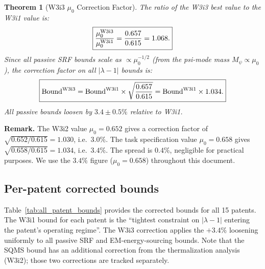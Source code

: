 \documentclass[11pt,twocolumn]{article}
\newcommand{\lam}{\lambda}
\newcommand{\Mpsi}{M_\psi}
\newtheorem{theorem}{Theorem}[section]
\begin{document}
\begin{theorem}[W3i3 $\mu_0$ Correction Factor]
\label{thm:mu0_w3i3}
The ratio of the W3i3 best value to the W3i1 value is:
\begin{equation}
\boxed{
\frac{\mu_0^{\rm W3i3}}{\mu_0^{\rm W3i1}} = \frac{0.657}{0.615} = 1.068.
}
\label{eq:mu0_ratio}
\end{equation}
Since all passive SRF bounds scale as $\propto \mu_0^{-1/2}$ (from
the psi-mode mass $\Mpsi \propto \mu_0$), the correction factor on
\emph{all} $|\lam-1|$ bounds is:
\begin{equation}
\boxed{
\text{Bound}^{\rm W3i3} = \text{Bound}^{\rm W3i1}\times
\sqrt{\frac{0.657}{0.615}} = \text{Bound}^{\rm W3i1}\times1.034.
}
\label{eq:bound_correction}
\end{equation}
All passive bounds loosen by $3.4\pm0.5\%$ relative to W3i1.
\end{theorem}

\textbf{Remark.} The W3i2 value $\mu_0 = 0.652$ gives a correction
factor of $\sqrt{0.652/0.615} = 1.030$, i.e.~$3.0\%$. The task
specification value $\mu_0 = 0.658$ gives $\sqrt{0.658/0.615} = 1.034$,
i.e.~$3.4\%$. The spread is $0.4\%$, negligible for practical purposes.
We use the $3.4\%$ figure ($\mu_0 = 0.658$) throughout this document.

\subsection{Per-patent corrected bounds}

Table~\ref{tab:all_patent_bounds} provides the corrected bounds for all
15 patents. The W3i1 bound for each patent is the ``tightest constraint
on $|\lam-1|$ entering the patent's operating regime''. The W3i3
correction applies the $+3.4\%$ loosening uniformly to all passive SRF
and EM-energy-sourcing bounds. Note that the SQMS bound has an
additional correction from the thermalization analysis (W3i2); those
two corrections are tracked separately.
\end{document}
